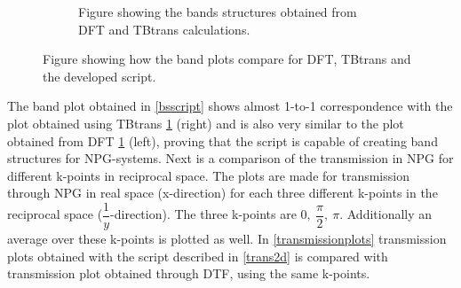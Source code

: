\begin{figure}[H]
\begin{subfigure}[t]{0.45\textwidth}
		\caption{Figure showing the bands structures obtained from DFT and TBtrans calculations.}
		\label{bsdfttbt}
	\end{subfigure}
	\caption{Figure showing how the band plots compare for DFT, TBtrans and the developed script.}\label{bandcompare}
\end{figure}
The band plot obtained in \cref{bsscript} shows almost 1-to-1 correspondence with the plot obtained using TBtrans \cref{bsdfttbt} (right) and is also very similar to the plot obtained from DFT \cref{bsdfttbt} (left), proving that the script is capable of creating band structures for NPG-systems. Next is a comparison of the transmission in NPG for different k-points in reciprocal space. The plots are made for transmission through NPG in real space (x-direction) for each three different k-points in the reciprocal space (\(\dfrac{1}{y}\)-direction). The three k-points are \(0,\ \dfrac{\pi}{2},\ \pi\). Additionally an average over these k-points is plotted as well. In \cref{transmissionplots} transmission plots obtained with the script described in \cref{trans2d} is compared with transmission plot obtained through DTF, using the same k-points.
